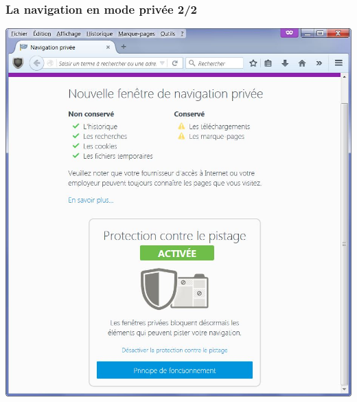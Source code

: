 \documentclass{beamer}
\begin{document}
\begin{frame}
\frametitle{La navigation en mode privée 2/2}
\begin{center}
\includegraphics[scale=0.5] {./images/Navigation_privee.jpg} 
\end{center}
\end{frame}
\end{document}
